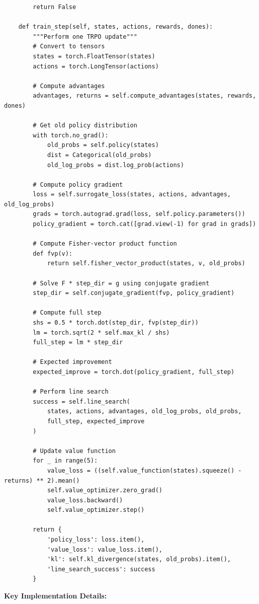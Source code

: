 \documentclass[12pt]{article}
\begin{document}
{{\begin{verbatim}
        return False

    def train_step(self, states, actions, rewards, dones):
        """Perform one TRPO update"""
        # Convert to tensors
        states = torch.FloatTensor(states)
        actions = torch.LongTensor(actions)

        # Compute advantages
        advantages, returns = self.compute_advantages(states, rewards, dones)

        # Get old policy distribution
        with torch.no_grad():
            old_probs = self.policy(states)
            dist = Categorical(old_probs)
            old_log_probs = dist.log_prob(actions)

        # Compute policy gradient
        loss = self.surrogate_loss(states, actions, advantages, old_log_probs)
        grads = torch.autograd.grad(loss, self.policy.parameters())
        policy_gradient = torch.cat([grad.view(-1) for grad in grads])

        # Compute Fisher-vector product function
        def fvp(v):
            return self.fisher_vector_product(states, v, old_probs)

        # Solve F * step_dir = g using conjugate gradient
        step_dir = self.conjugate_gradient(fvp, policy_gradient)

        # Compute full step
        shs = 0.5 * torch.dot(step_dir, fvp(step_dir))
        lm = torch.sqrt(2 * self.max_kl / shs)
        full_step = lm * step_dir

        # Expected improvement
        expected_improve = torch.dot(policy_gradient, full_step)

        # Perform line search
        success = self.line_search(
            states, actions, advantages, old_log_probs, old_probs,
            full_step, expected_improve
        )

        # Update value function
        for _ in range(5):
            value_loss = ((self.value_function(states).squeeze() - returns) ** 2).mean()
            self.value_optimizer.zero_grad()
            value_loss.backward()
            self.value_optimizer.step()

        return {
            'policy_loss': loss.item(),
            'value_loss': value_loss.item(),
            'kl': self.kl_divergence(states, old_probs).item(),
            'line_search_success': success
        }
\end{verbatim}

\textbf{Key Implementation Details:}

}}
\end{document}
